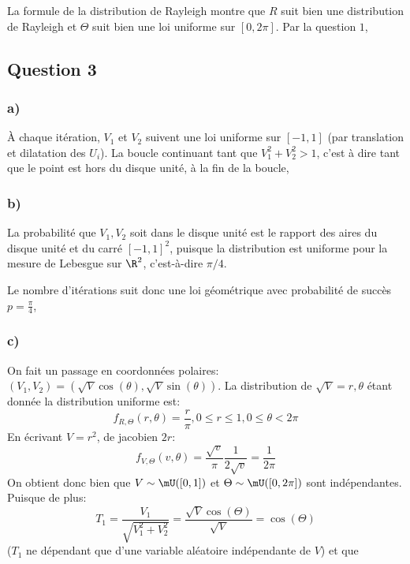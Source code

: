 \documentclass[math, info]{mpb-cours}
\begin{document}
La formule de la distribution de Rayleigh montre que $R$ suit bien une distribution de Rayleigh et $\Theta$ suit bien une loi uniforme sur $[0, 2\pi]$.
Par la question $1$, 

\subsection{Question 3}
\subsubsection{a)}
À chaque itération, $V_{1}$ et $V_{2}$ suivent une loi uniforme sur $[-1, 1]$ (par translation et dilatation des $U_{i}$).
La boucle continuant tant que $V_{1}^{2} + V_{2}^{2} > 1$, c'est à dire tant que le point est hors du disque unité, à la fin de la boucle, 

\subsubsection{b)}
La probabilité que $V_{1}, V_{2}$ soit dans le disque unité est le rapport des aires du disque unité et du carré $[-1, 1]^{2}$, puisque la distribution est uniforme pour la mesure de Lebesgue sur $\R^{2}$, c'est-à-dire $\pi / 4$.

Le nombre d'itérations suit donc une loi géométrique avec probabilité de succès $p = \frac{\pi}{4}$, 

\subsubsection{c)}
On fait un passage en coordonnées polaires: $(V_{1}, V_{2}) = (\sqrt{V}\cos(\theta), \sqrt{V}\sin(\theta))$.
La distribution de $\sqrt{V} = r, \theta$ étant donnée la distribution uniforme est:
\begin{equation*}
	f_{R, \Theta}(r, \theta) = \frac{r}{\pi}, 0\leq r\leq 1, 0\leq \theta < 2\pi
\end{equation*}
En écrivant $V = r^{2}$, de jacobien $2r$:
\begin{equation*}
	f_{V, \Theta}(v, \theta) = \frac{\sqrt{v}}{\pi}\frac{1}{2\sqrt{v}} = \frac{1}{2\pi}
\end{equation*}
On obtient donc bien que $V \sim \mU([0, 1])$ et $\Theta \sim \mU([0, 2\pi])$ sont indépendantes.
Puisque de plus:
\begin{equation*}
	T_{1} = \frac{V_{1}}{\sqrt{V_{1}^{2} + V_{2}^{2}}} = \frac{\sqrt{V}\cos(\Theta)}{\sqrt{V}} = \cos(\Theta)
\end{equation*}
 ($T_{1}$ ne dépendant que d'une variable aléatoire indépendante de $V$) et que 
\end{document}
